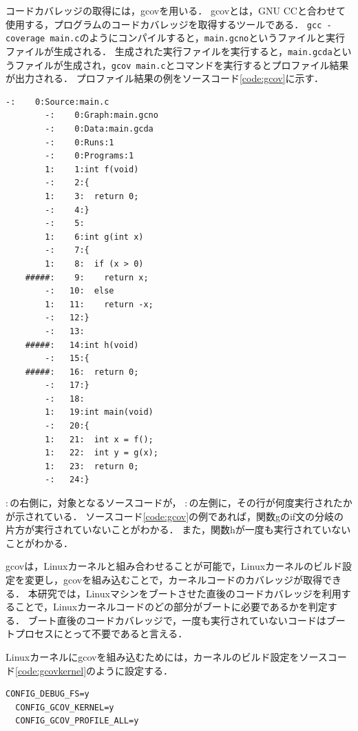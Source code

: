 \documentclass[graduation-thesis]{mlarticle}
\begin{document}
コードカバレッジの取得には，gcovを用いる．
gcovとは，GNU CCと合わせて使用する，プログラムのコードカバレッジを取得するツールである．
\texttt{gcc -coverage main.c}のようにコンパイルすると，\texttt{main.gcno}というファイルと実行ファイルが生成される．
生成された実行ファイルを実行すると，\texttt{main.gcda}というファイルが生成され，\texttt{gcov main.c}とコマンドを実行するとプロファイル結果が出力される．
プロファイル結果の例をソースコード\ref{code:gcov}に示す．

\begin{lstlisting}[caption=gcovの実行結果例, label=code:gcov]
        -:    0:Source:main.c
        -:    0:Graph:main.gcno
        -:    0:Data:main.gcda
        -:    0:Runs:1
        -:    0:Programs:1
        1:    1:int f(void)
        -:    2:{
        1:    3:  return 0;
        -:    4:}
        -:    5:
        1:    6:int g(int x)
        -:    7:{
        1:    8:  if (x > 0)
    #####:    9:    return x;
        -:   10:  else
        1:   11:    return -x;
        -:   12:}
        -:   13:
    #####:   14:int h(void)
        -:   15:{
    #####:   16:  return 0;
        -:   17:}
        -:   18:
        1:   19:int main(void)
        -:   20:{
        1:   21:  int x = f();
        1:   22:  int y = g(x);
        1:   23:  return 0;
        -:   24:}
\end{lstlisting}

$:$の右側に，対象となるソースコードが，
$:$の左側に，その行が何度実行されたかが示されている．
ソースコード\ref{code:gcov}の例であれば，関数gのif文の分岐の片方が実行されていないことがわかる．
また，関数hが一度も実行されていないことがわかる．

gcovは，Linuxカーネルと組み合わせることが可能で，Linuxカーネルのビルド設定を変更し，gcovを組み込むことで，カーネルコードのカバレッジが取得できる．
本研究では，Linuxマシンをブートさせた直後のコードカバレッジを利用することで，Linuxカーネルコードのどの部分がブートに必要であるかを判定する．
ブート直後のコードカバレッジで，一度も実行されていないコードはブートプロセスにとって不要であると言える．

Linuxカーネルにgcovを組み込むためには，カーネルのビルド設定をソースコード\ref{code:gcovkernel}のように設定する．

\begin{lstlisting}[caption=gcovを組み込むLinuxカーネルの設定, label=code:gcovkernel]
  CONFIG_DEBUG_FS=y
  CONFIG_GCOV_KERNEL=y
  CONFIG_GCOV_PROFILE_ALL=y
\end{lstlisting}
\end{document}
